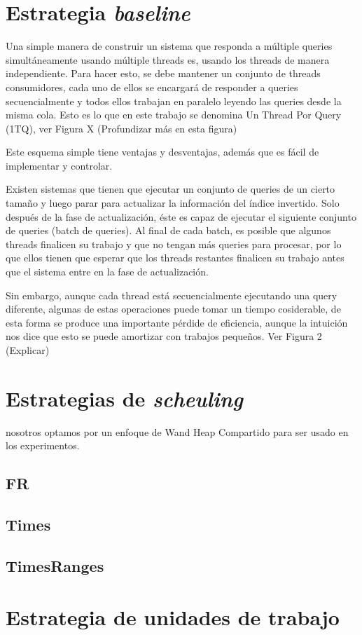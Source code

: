 \section{Estrategia \textit{baseline}}
\label{scheduling:baseline}
Una simple manera de construir un sistema que responda a múltiple queries simultáneamente usando múltiple threads es, usando los threads de manera independiente. Para hacer esto, se debe mantener un conjunto de threads consumidores, cada uno de ellos se encargará de responder a queries secuencialmente y todos ellos trabajan en paralelo leyendo las queries desde la misma cola. Esto es lo que en este trabajo se denomina Un Thread Por Query (1TQ), ver Figura X (Profundizar más en esta figura)

Este esquema simple tiene ventajas y desventajas, además que es fácil de implementar y controlar. 

Existen sistemas que tienen que ejecutar un conjunto de queries de un cierto tamaño y luego parar para actualizar la información del índice invertido. Solo después de la fase de actualización, éste es capaz de ejecutar el siguiente conjunto de queries (batch de queries). Al final de cada batch, es posible que algunos threads finalicen su trabajo y que no tengan más queries para procesar, por lo que ellos tienen que esperar que los threads restantes finalicen su trabajo antes que el sistema entre en la fase de actualización. 

Sin embargo, aunque cada thread está secuencialmente ejecutando una query diferente, algunas de estas operaciones puede tomar un tiempo cosiderable, de esta forma se produce una importante pérdide de eficiencia, aunque la intuición nos dice que esto se puede amortizar con trabajos pequeños. Ver Figura 2 (Explicar)




\section{Estrategias de \textit{scheuling}}
\label{scheduling:es}
nosotros optamos por un enfoque de Wand Heap Compartido para ser usado en los experimentos.
\subsection{FR}
\label{scheduling:fr}

\subsection{Times}
\label{scheduling:times}

\subsection{TimesRanges}
\label{scheduling:timesranges}




\section{Estrategia de unidades de trabajo}
\label{scheduling:unidadestrabajo}